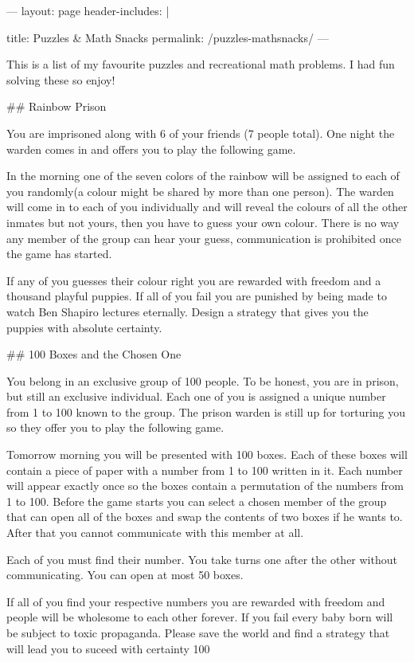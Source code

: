 ---
layout: page
header-includes: |
    \usepackage{tikz,pgfplots}
    \usepackage{fancyhdr}
    \pagestyle{fancy}
    \fancyfoot[LE,RO]{\thepage}
title: Puzzles & Math Snacks
permalink: /puzzles-mathsnacks/
---

This is a list of my favourite puzzles and recreational math problems. I had
fun solving these so enjoy!

## Rainbow Prison

You are imprisoned along with 6 of your friends (7 people total). One night the
warden comes in and offers you to play the following game. 

In the morning one of the seven colors of the rainbow will be assigned to each of you
randomly(a colour might be shared by more than one person). The warden will
come in to each of you individually and will reveal the colours of all the
other inmates but not yours, then you have to guess your own colour. There is
no way any member of the group can hear your guess, communication is prohibited
once the game has started.

If any of you guesses their colour right you are rewarded with freedom and a
thousand playful puppies. If all of you fail you are punished by being made to
watch Ben Shapiro lectures eternally. Design a strategy that gives you the
puppies with absolute certainty.

## 100 Boxes and the Chosen One

You belong in an exclusive group of 100 people. To be honest, you are in
prison, but still an exclusive individual. Each one of you is assigned a unique number
from 1 to 100 known to the group. The prison warden is still up for torturing
you so they offer you to play the following game.

Tomorrow morning you will be presented with 100 boxes. Each of these boxes will
contain a piece of paper with a number from 1 to 100 written in it. Each number
will appear exactly once so the boxes contain a permutation of the numbers from
1 to 100. Before the game starts you can select a chosen member of the group
that can open all of the boxes and swap the contents of two boxes if he wants
to. After that you cannot communicate with this member at all.

Each of you must find their number. You take turns one after the other without
communicating. You can open at most 50 boxes. 

If all of you find your respective numbers you are rewarded with freedom and
people will be wholesome to each other forever. If you fail every baby born
will be subject to toxic propaganda. Please save the world and find a strategy
that will lead you to suceed with certainty 100%

